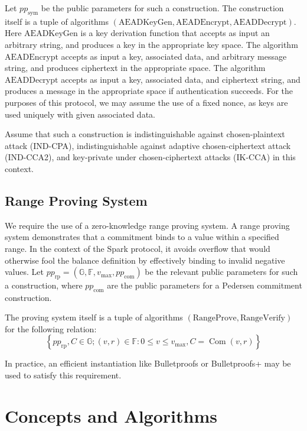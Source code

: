 \documentclass{llncs}
\newcommand{\G}{\mathbb{G}}
\newcommand{\F}{\mathbb{F}}
\newcommand{\com}{\operatorname{Com}}
\begin{document}
Let $pp_{\text{sym}}$ be the public parameters for such a construction.
The construction itself is a tuple of algorithms $(\text{AEADKeyGen},\text{AEADEncrypt},\text{AEADDecrypt})$.
Here $\text{AEADKeyGen}$ is a key derivation function that accepts as input an arbitrary string, and produces a key in the appropriate key space.
The algorithm $\text{AEADEncrypt}$ accepts as input a key, associated data, and arbitrary message string, and produces ciphertext in the appropriate space.
The algorithm $\text{AEADDecrypt}$ accepts as input a key, associated data, and ciphertext string, and produces a message in the appropriate space if authentication succeeds.
For the purposes of this protocol, we may assume the use of a fixed nonce, as keys are used uniquely with given associated data.

Assume that such a construction is indistinguishable against chosen-plaintext attack (IND-CPA), indistinguishable against adaptive chosen-ciphertext attack (IND-CCA2), and key-private under chosen-ciphertext attacks (IK-CCA) in this context.


\subsection{Range Proving System}

We require the use of a zero-knowledge range proving system.
A range proving system demonstrates that a commitment binds to a value within a specified range.
In the context of the Spark protocol, it avoids overflow that would otherwise fool the balance definition by effectively binding to invalid negative values.
Let $pp_{\text{rp}} = (\G, \F, v_{\text{max}}, pp_{\text{com}})$ be the relevant public parameters for such a construction, where $pp_{\text{com}}$ are the public parameters for a Pedersen commitment construction.

The proving system itself is a tuple of algorithms $(\text{RangeProve},\text{RangeVerify})$ for the following relation:
$$\left\{ pp_{\text{rp}}, C \in \G ; (v, r) \in \F : 0 \leq v \leq v_{\text{max}}, C = \com(v,r) \right\}$$

In practice, an efficient instantiation like Bulletproofs \cite{bp} or Bulletproofs+ \cite{bp_plus} may be used to satisfy this requirement.


\section{Concepts and Algorithms}
\end{document}

